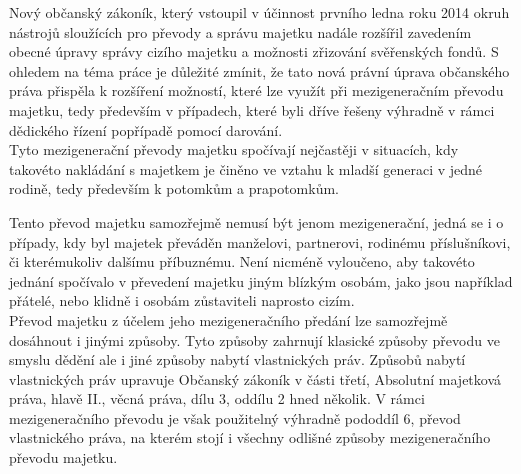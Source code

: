 \documentclass{article}
\begin{document}
Nový občanský zákoník, který vstoupil v účinnost prvního ledna roku 2014 okruh nástrojů sloužících pro převody a správu majetku nadále rozšířil zavedením obecné úpravy správy cizího majetku a možnosti zřizování svěřenských fondů. S ohledem na téma práce je důležité zmínit, že tato nová právní úprava občanského práva přispěla k rozšíření možností, které lze využít při mezigeneračním převodu majetku, tedy především v případech, které byli dříve řešeny výhradně v rámci dědického řízení popřípadě pomocí darování.\\

Tyto mezigenerační převody majetku spočívají nejčastěji v situacích, kdy takovéto nakládání s majetkem je činěno ve vztahu k mladší generaci v jedné rodině, tedy především k potomkům a prapotomkům. 

Tento převod majetku samozřejmě nemusí být jenom mezigenerační, jedná se i o případy, kdy byl majetek převáděn manželovi, partnerovi, rodinému příslušníkovi, či kterémukoliv dalšímu příbuznému. Není nicméně vyloučeno, aby takovéto jednání spočívalo v převedení majetku jiným blízkým osobám, jako jsou například přátelé, nebo klidně i osobám zůstaviteli naprosto cizím.\\



Převod majetku z účelem jeho mezigeneračního předání lze samozřejmě dosáhnout i jinými způsoby. Tyto způsoby zahrnují klasické způsoby převodu ve smyslu dědění ale i jiné způsoby nabytí vlastnických práv. Způsobů nabytí vlastnických práv upravuje Občanský zákoník v části třetí, Absolutní majetková práva, hlavě II., věcná práva, dílu 3, oddílu 2 hned několik. V rámci mezigeneračního převodu je však použitelný výhradně pododdíl 6, převod vlastnického práva, na kterém stojí i všechny odlišné způsoby mezigeneračního převodu majetku.
\end{document}
